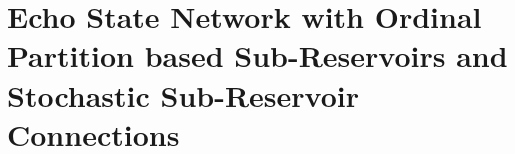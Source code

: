 
\chapter{Echo State Network with Ordinal Partition based Sub-Reservoirs and Stochastic Sub-Reservoir Connections}
